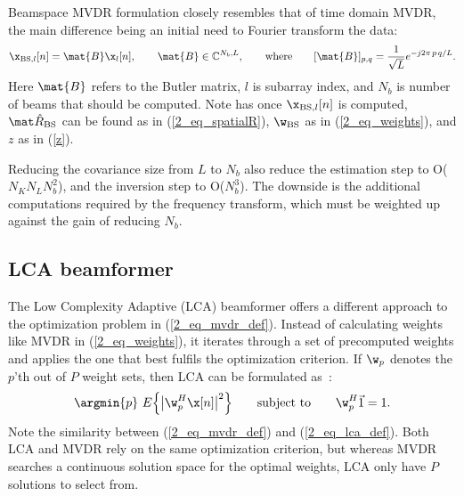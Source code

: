 {Beamspace MVDR formulation closely resembles that of time domain MVDR, the main difference being an initial need to Fourier transform the data:
%
\begin{gather}
\x_{\text{BS},l}[n] = \mat{B}\x_l[n], \qquad \mat{B}\in \mathbb{C}^{N_b,L}, \qquad \text{where} \qquad [\mat{B}]_{p,q} = \frac{1}{\sqrt{L}} e^{-j2\pi\,p\,q/L}.\label{2_eq_beamspace}
\end{gather}
%
Here $\mat{B}$ refers to the Butler matrix, $l$ is subarray index, and $N_b$ is number of beams that should be computed. Note has once $\x_{\text{BS},l}[n]$ is computed, $\eR_\text{BS}$ can be found as in (\ref{2_eq_spatialR}), $\w_\text{BS}$ as in (\ref{2_eq_weights}), and $z$ as in (\ref{z}).

Reducing the covariance size from $L$ to $N_b$ also reduce the estimation step to O($N_K N_L N_b^2$), and the inversion step to O($N_b^3$). The downside is the additional computations required by the frequency transform, which must be weighted up against the gain of reducing $N_b$.


\subsection{LCA beamformer}

The Low Complexity Adaptive (LCA) beamformer offers a different approach to the optimization problem in (\ref{2_eq_mvdr_def}). Instead of calculating weights like MVDR in (\ref{2_eq_weights}), it iterates through a set of precomputed weights and applies the one that best fulfils the optimization criterion. If $\w_p$ denotes the $p$'th out of $P$ weight sets, then LCA can be formulated as~\cite{Synnevag2008}:
%
\begin{gather}
\argmin{p}\ E\Big\{\big|\w_p^H\x[n]\big|^2\Big\} \qquad\text{subject to}\qquad \w_p^H\1 = 1. \label{2_eq_lca_def}
\end{gather}
%
Note the similarity between (\ref{2_eq_mvdr_def}) and (\ref{2_eq_lca_def}). Both LCA and MVDR rely on the same optimization criterion, but whereas MVDR searches a continuous solution space for the optimal weights, LCA only have $P$ solutions to select from.





}
